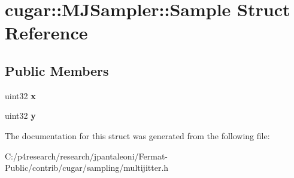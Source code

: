 \hypertarget{structcugar_1_1_m_j_sampler_1_1_sample}{}\section{cugar\+:\+:M\+J\+Sampler\+:\+:Sample Struct Reference}
\label{structcugar_1_1_m_j_sampler_1_1_sample}
\subsection*{Public Members}
\begin{DoxyCompactItemize}
\item 
\mbox{\label{structcugar_1_1_m_j_sampler_1_1_sample_afbc424a89037309b7e47f57c5cb16ee1}} 
uint32 {\bfseries x}
\item 
\mbox{\label{structcugar_1_1_m_j_sampler_1_1_sample_aa583b6c7d479b6ba99f70f7a5a03eb48}} 
uint32 {\bfseries y}
\end{DoxyCompactItemize}


The documentation for this struct was generated from the following file\+:\begin{DoxyCompactItemize}
\item 
C\+:/p4research/research/jpantaleoni/\+Fermat-\/\+Public/contrib/cugar/sampling/multijitter.\+h\end{DoxyCompactItemize}
